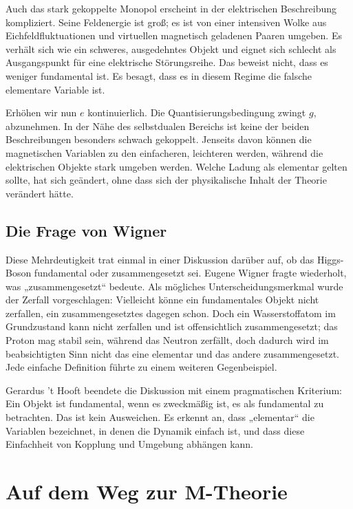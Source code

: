 Auch das stark gekoppelte Monopol erscheint in der elektrischen Beschreibung kompliziert. Seine Feldenergie ist groß; es ist von einer intensiven Wolke aus Eichfeldfluktuationen und virtuellen magnetisch geladenen Paaren umgeben. Es verhält sich wie ein schweres, ausgedehntes Objekt und eignet sich schlecht als Ausgangspunkt für eine elektrische Störungsreihe. Das beweist nicht, dass es weniger fundamental ist. Es besagt, dass es in diesem Regime die falsche elementare Variable ist.

Erhöhen wir nun \(e\) kontinuierlich. Die Quantisierungsbedingung zwingt \(g\), abzunehmen. In der Nähe des selbstdualen Bereichs ist keine der beiden Beschreibungen besonders schwach gekoppelt. Jenseits davon können die magnetischen Variablen zu den einfacheren, leichteren werden, während die elektrischen Objekte stark umgeben werden. Welche Ladung als elementar gelten sollte, hat sich geändert, ohne dass sich der physikalische Inhalt der Theorie verändert hätte.

\subsection{Die Frage von Wigner}

Diese Mehrdeutigkeit trat einmal in einer Diskussion darüber auf, ob das Higgs-Boson fundamental oder zusammengesetzt sei. Eugene Wigner fragte wiederholt, was „zusammengesetzt“ bedeute. Als mögliches Unterscheidungsmerkmal wurde der Zerfall vorgeschlagen: Vielleicht könne ein fundamentales Objekt nicht zerfallen, ein zusammengesetztes dagegen schon. Doch ein Wasserstoffatom im Grundzustand kann nicht zerfallen und ist offensichtlich zusammengesetzt; das Proton mag stabil sein, während das Neutron zerfällt, doch dadurch wird im beabsichtigten Sinn nicht das eine elementar und das andere zusammengesetzt. Jede einfache Definition führte zu einem weiteren Gegenbeispiel.

Gerardus ’t Hooft beendete die Diskussion mit einem pragmatischen Kriterium: Ein Objekt ist fundamental, wenn es zweckmäßig ist, es als fundamental zu betrachten. Das ist kein Ausweichen. Es erkennt an, dass „elementar“ die Variablen bezeichnet, in denen die Dynamik einfach ist, und dass diese Einfachheit von Kopplung und Umgebung abhängen kann.

\section{Auf dem Weg zur M-Theorie}

